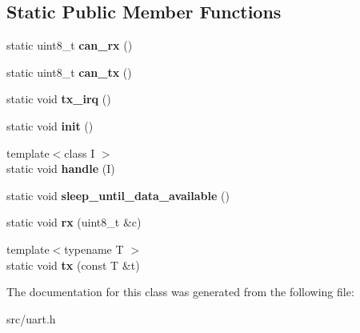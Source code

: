 \subsection*{Static Public Member Functions}
\begin{DoxyCompactItemize}
\item 
\hypertarget{classUart_a6c161d1f3756de42bd7e71db62499c55}{}\label{classUart_a6c161d1f3756de42bd7e71db62499c55} 
static uint8\+\_\+t {\bfseries can\+\_\+rx} ()
\item 
\hypertarget{classUart_a44aa3c55760475395e3a45af6498b9b4}{}\label{classUart_a44aa3c55760475395e3a45af6498b9b4} 
static uint8\+\_\+t {\bfseries can\+\_\+tx} ()
\item 
\hypertarget{classUart_ab95b2a2c36012e3e34d200e720f14402}{}\label{classUart_ab95b2a2c36012e3e34d200e720f14402} 
static void {\bfseries tx\+\_\+irq} ()
\item 
\hypertarget{classUart_a402fb771b97c6086339ef5ed1e796dbb}{}\label{classUart_a402fb771b97c6086339ef5ed1e796dbb} 
static void {\bfseries init} ()
\item 
\hypertarget{classUart_a978f2e11bdccc2cc64efe9efbb3c4111}{}\label{classUart_a978f2e11bdccc2cc64efe9efbb3c4111} 
{\footnotesize template$<$class I $>$ }\\static void {\bfseries handle} (I)
\item 
\hypertarget{classUart_abf6d7c3471e104a4a211ca57425096c3}{}\label{classUart_abf6d7c3471e104a4a211ca57425096c3} 
static void {\bfseries sleep\+\_\+until\+\_\+data\+\_\+available} ()
\item 
\hypertarget{classUart_af5ac57cdb25773aebfe644b080e0da3a}{}\label{classUart_af5ac57cdb25773aebfe644b080e0da3a} 
static void {\bfseries rx} (uint8\+\_\+t \&c)
\item 
\hypertarget{classUart_af1b3b331220c1c2871ea3f7844736e85}{}\label{classUart_af1b3b331220c1c2871ea3f7844736e85} 
{\footnotesize template$<$typename T $>$ }\\static void {\bfseries tx} (const T \&t)
\end{DoxyCompactItemize}


The documentation for this class was generated from the following file\+:\begin{DoxyCompactItemize}
\item 
src/uart.\+h\end{DoxyCompactItemize}
